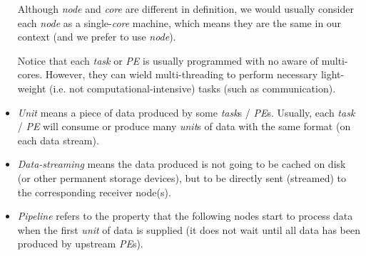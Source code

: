\begin{itemize}
\begin{term_box}
Although \emph{node} and \emph{core} are different in definition, we would usually consider each \emph{node} as a single-\emph{core} machine, which means they are the same in our context (and we prefer to use \emph{node}).
\end{term_box}	

\begin{term_box}
Notice that each \emph{task} or \emph{PE} is usually programmed with no aware of multi-cores. However, they can wield multi-threading to perform necessary light-weight (i.e. not computational-intensive) tasks (such as communication).
\end{term_box}
	
\item \emph{Unit} means a piece of data produced by some \emph{task}s / \emph{PE}s. Usually, each \emph{task} / \emph{PE} will consume or produce many \emph{unit}s of data with the same format (on each data stream).

\item \emph{Data-streaming} means the data produced is not going to be cached on disk (or other permanent storage devices), but to be directly sent (\ie streamed) to the corresponding receiver node(s).

\item \emph{Pipeline} refers to the property that the following nodes start to process data when the first \emph{unit} of data is supplied (\ie it does not wait until all data has been produced by upstream \emph{PE}s).

\end{itemize}


